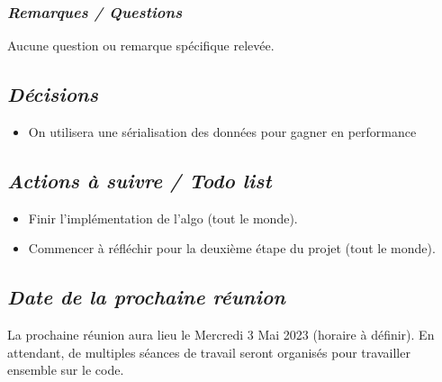 \documentclass[french,a4paper]{article}
\begin{document}
\subsubsection*{\textit{Remarques / Questions}}
Aucune question ou remarque spécifique relevée.

\subsection*{\textit{Décisions}}
\begin{itemize}
    \item On utilisera une sérialisation des données pour gagner en performance
\end{itemize}

\subsection*{\textit{Actions à suivre / Todo list}}
\begin{itemize}
  \item Finir l'implémentation de l'algo (tout le monde).
  \item Commencer à réfléchir pour la deuxième étape du projet (tout le monde).
\end{itemize}

\subsection*{\textit{Date de la prochaine réunion}}
La prochaine réunion aura lieu le Mercredi 3 Mai 2023 (horaire à définir). 
En attendant, de multiples séances de travail seront organisés pour travailler ensemble sur le code.
\end{document}
